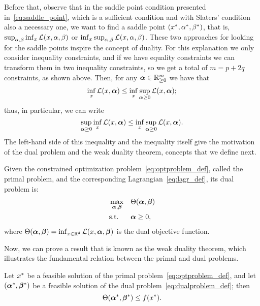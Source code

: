 %
Before that, observe that in the saddle point condition presented in~\eqref{eq:saddle_point}, which is a sufficient condition and with Slaters' condition also a necessary one, we want to find a saddle point $({x}^*, {\alpha}^*, {\beta}^*)$, 
%
that is, $\sup_{\alpha, \beta} \inf_{x} \mathcal{L}(x, \alpha, \beta)$ or $\inf_{x} \sup_{\alpha, \beta} \mathcal{L}(x, \alpha, \beta)$. 
%
These two approaches for looking for the saddle points inspire the concept of duality.
%
For this explanation we only consider inequality constraints, and if we have equality constraints we can transform them in two inequality constraints, so we get a total of $m = p + 2q$ constraints, as shown above. Then, for any $\bm{\alpha} \in \mathbb{R}^m_{\geq 0}$ we have that
\begin{equation}
    \nonumber
    \inf_{x} \mathcal{L}(x, \bm{\alpha}) \leq \inf_{x} \sup_{\bm{\alpha} \geq 0} \mathcal{L}(x, \bm{\alpha});
\end{equation}
thus, in particular, we can write
\begin{equation}
    \label{eq:lagr_weakth}
    \sup_{\fv{\alpha} \geq 0} \inf_{x} \lagr(x, \fv{\alpha}) \leq \inf_{x} \sup_{\fv{\alpha} \geq 0} \lagr(x, \fv{\alpha}).
\end{equation}
The left-hand side of this inequality and the inequality itself give the motivation of the dual problem and the weak duality theorem, concepts that we define next.
%
\begin{definition}\label{def:dual_problem}
    Given the constrained optimization problem~\eqref{eq:optproblem_def}, called the primal problem, and the corresponding Lagrangian~\eqref{eq:lagr_def}, its dual problem is:
    \begin{equation}\label{eq:dualproblem_def}
        \begin{aligned}
            &\max_{\fv{\alpha}, \fv{\beta}} & & \Theta(\fv{\alpha}, \fv{\beta}) \\
            & \text{s.t.} & & \fv{\alpha} \geq 0 ,          
        \end{aligned}  
    \end{equation}
    where $\Theta(\bm{\alpha}, \bm{\beta}) = \inf_{x \in \mathbb{R}^d}\mathcal{L}(x, \bm{\alpha}, \bm{\beta})$ is the dual objective function.
\end{definition}
%
Now, we can prove a result that is known as the weak duality theorem, which illustrates the fundamental relation between the primal and dual problems.
%
\begin{theorem}
    Let ${x}^*$ be a feasible solution of the primal problem~\eqref{eq:optproblem_def}, and let $({\bm{\alpha}}^*, {\bm{\beta}}^*)$ be a feasible solution of the dual problem~\eqref{eq:dualproblem_def}; then 
    $$ \Theta({\bm{\alpha}}^*, {\bm{\beta}}^*) \leq f({x}^*) .$$
\end{theorem}
